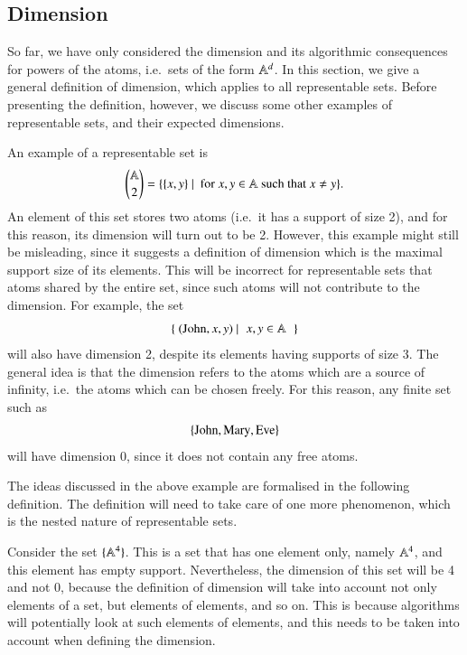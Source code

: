 \subsection{Dimension}
\label{sec:dimension}
So far, we have only considered the dimension and its algorithmic consequences for powers of the atoms, i.e.~sets  of the form $\mathbb A^d$. In this section, we give a general definition of dimension, which applies to all representable sets. Before presenting the definition, however, we discuss some other examples of representable sets, and their expected dimensions.

\begin{myexample} An example of a representable set is 
\begin{align*}
   {\mathbb A\choose 2} = \{ \{x,y\}\ |\ \text{ for }x,y \in \mathbb A \text{ such that }x \neq y\}.
\end{align*}
An element of this set stores two atoms (i.e.~it has a support of size 2), and for this reason, its dimension will turn out to be 2. However, this example might still be misleading, since it suggests a definition of dimension which is the maximal support size of its elements. This will be incorrect for  representable sets that  atoms  shared by the entire set, since  such atoms will not contribute to the dimension. For example, the set 
\begin{align*}
\setbuild{
    (\john,x,y)
}
{ $x,y \in \atoms$}
\end{align*}
will also have dimension 2, despite its elements having supports of size 3. The general idea is that the dimension refers to the atoms which are a source of infinity, i.e.~the atoms which can be chosen freely. For this reason, any finite set such as 
\begin{align*}
    \{\text{John},\text{Mary},\text{Eve}\}
\end{align*}
will have dimension 0, since it does not contain any free atoms. 
\end{myexample}

The ideas discussed in the above example are formalised in the following definition. The definition will need to take care of one more phenomenon, which is the nested nature of representable sets.

\begin{myexample}
    Consider the set $\{\mathbb A^4\}$. This is a set that has one element only, namely $\mathbb A^4$, and this element has empty support.  Nevertheless, the dimension of this set will be 4 and not 0, because the definition of dimension will take into account not only elements of a set, but elements of elements, and so on. This is because algorithms will potentially look at such elements of elements, and this needs to be taken into account when defining the dimension.
\end{myexample}

